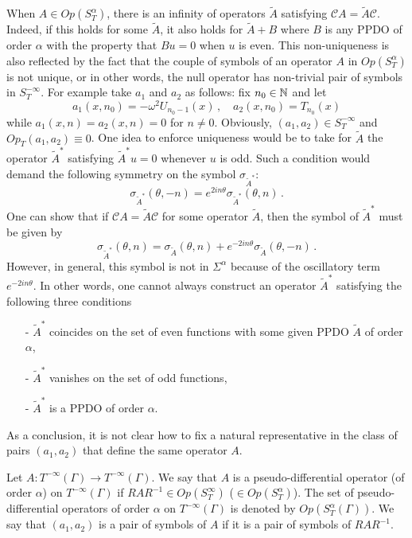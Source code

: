 \documentclass[a4paper]{article}
\begin{document}
\begin{Rem}
	When $A \in \textit{Op}(S^\alpha_T)$, there is an infinity of operators $\tilde{A}$ satisfying $\mathcal{C}A = \tilde{A} \mathcal{C}$. Indeed, if this holds for some $\tilde{A}$, it also holds for $\tilde{A} + B$ where $B$ is any PPDO of order $\alpha$ with the property that $Bu = 0$ when $u$ is even. This non-uniqueness is also reflected by the fact that the couple of symbols of an operator $A$ in $\textit{Op}(S^\alpha_T)$ is not unique, or in other words, the null operator has non-trivial pair of symbols in $S^{-\infty}_T$. For example take $a_1$ and $a_2$ as follows: fix $n_0 \in \mathbb{N}$ and let 
	\[a_1(x,n_0) = -\omega^2 U_{n_0-1}(x)\,, \quad a_2(x,n_0) = T_{n_0}(x)\]
	while $a_1(x,n) = a_2(x,n) = 0$ for $n \neq 0$. Obviously, $(a_1,a_2) \in S^{-\infty}_T$ and $\textit{Op}_T(a_1,a_2) \equiv 0$. 
	One idea to enforce uniqueness would be to take for $\tilde{A}$ the operator $\tilde{A}^*$ satisfying $\tilde{A}^*u = 0$ whenever $u$ is odd. Such a condition would demand the following symmetry on the symbol $\sigma_{\tilde{A}^*}:$
	\[\sigma_{\tilde{A}^*}(\theta,-n) = e^{2in\theta}\sigma_{\tilde{A}^*}(\theta,n)\,.\]
	One can show that if $\mathcal{C}A = \tilde{A} \mathcal{C}$ for some operator $\tilde{A}$, then the symbol of $\tilde{A}^*$ must be given by
	\[\sigma_{\tilde{A}^*}(\theta,n) = \sigma_{\tilde{A}}(\theta,n) + e^{-2in\theta}\sigma_{\tilde{A}}(\theta,-n)\,.\] 
	However, in general, this symbol is not in $\Sigma^\alpha$ because of the oscillatory term $e^{-2in\theta}$. In other words, one cannot always construct an operator $\tilde{A}^*$  satisfying the following three conditions 
	\begin{itemize}
		\item[-] $\tilde{A}^*$ coincides on the set of even functions with some given PPDO $\tilde{A}$ of order $\alpha$,
		\item[-] $\tilde{A}^*$ vanishes on the set of odd functions,
		\item[-] $\tilde{A}^*$ is a PPDO of order $\alpha$. 
	\end{itemize}
	As a conclusion, it is not clear how to fix a natural representative in the class of pairs $(a_1,a_2)$ that define the same operator $A$. 
\end{Rem}
\begin{Def}
	Let $A : T^{-\infty}(\Gamma) \to T^{-\infty}(\Gamma)$. We say that $A$ is a pseudo-differential operator (of order $\alpha$) on $T^{-\infty}(\Gamma)$ if $R A R^{-1} \in Op(S^{\infty}_T)$ ($\in Op(S_T^{\alpha})$). The set of pseudo-differential operators of order $\alpha$ on $T^{-\infty}(\Gamma)$ is denoted by $\textit{Op}(S^{\alpha}_T(\Gamma))$. We say that $(a_1,a_2)$ is a pair of symbols of $A$ if it is a pair of symbols of $RAR^{-1}$.  
\end{Def}
\end{document}
